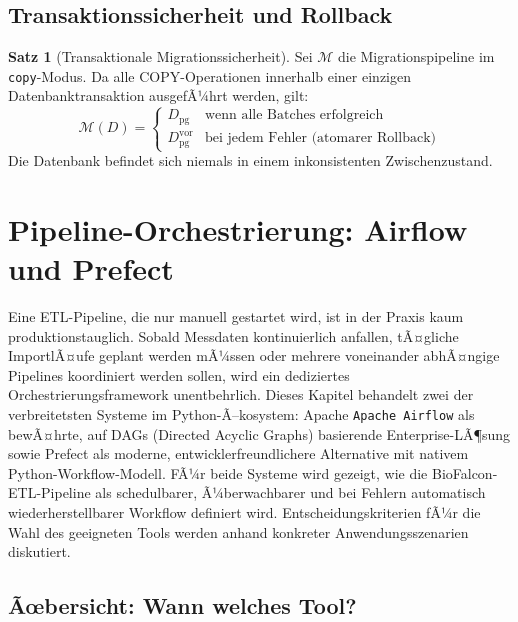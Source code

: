 ﻿\documentclass[12pt,a4paper]{report}
\theoremstyle{definition}
\newtheorem{theorem}{Satz}[section]
\theoremstyle{remark}
\newcommand{\airflow}{\texttt{Apache Airflow}}
\newcommand{\code}[1]{\texttt{#1}}
\begin{document}
\section{Transaktionssicherheit und Rollback}

\begin{theorem}[Transaktionale Migrationssicherheit]
  Sei $\mathcal{M}$ die Migrationspipeline im \code{copy}-Modus.
  Da alle COPY-Operationen innerhalb einer einzigen Datenbanktransaktion
  ausgefÃ¼hrt werden, gilt:
  \[
    \mathcal{M}(D) =
    \begin{cases}
      D_{\text{pg}} & \text{wenn alle Batches erfolgreich} \\
      D_{\text{pg}}^{\text{vor}} & \text{bei jedem Fehler (atomarer Rollback)}
    \end{cases}
  \]
  Die Datenbank befindet sich niemals in einem inkonsistenten
  Zwischenzustand.
\end{theorem}

\chapter{Pipeline-Orchestrierung: Airflow und Prefect}
\label{sec:orchestration}

Eine ETL-Pipeline, die nur manuell gestartet wird, ist in der Praxis kaum produktionstauglich. Sobald Messdaten kontinuierlich anfallen, tÃ¤gliche ImportlÃ¤ufe geplant werden mÃ¼ssen oder mehrere voneinander abhÃ¤ngige Pipelines koordiniert werden sollen, wird ein dediziertes Orchestrierungsframework unentbehrlich. Dieses Kapitel behandelt zwei der verbreitetsten Systeme im Python-Ã–kosystem: Apache \airflow{} als bewÃ¤hrte, auf DAGs (Directed Acyclic Graphs) basierende Enterprise-LÃ¶sung sowie Prefect als moderne, entwicklerfreundlichere Alternative mit nativem Python-Workflow-Modell. FÃ¼r beide Systeme wird gezeigt, wie die BioFalcon-ETL-Pipeline als schedulbarer, Ã¼berwachbarer und bei Fehlern automatisch wiederherstellbarer Workflow definiert wird. Entscheidungskriterien fÃ¼r die Wahl des geeigneten Tools werden anhand konkreter Anwendungsszenarien diskutiert.

\section{Ãœbersicht: Wann welches Tool?}
\end{document}

